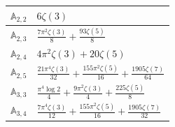 \documentclass{amsart}
\theoremstyle{definition}
\begin{document}
\begin{center}
\begin{tabular}{ |l|l| }
    $\mathbb{A}_{2,2}$ & $6\zeta(3)$   \\ \hline
    $\mathbb{A}_{2,3}$ & $\frac{7\pi ^2 \zeta (3)}{8}+\frac{93 \zeta (5)}{8}$    \\ \hline
    $\mathbb{A}_{2,4}$ & $4\pi^2\zeta(3)+20\zeta(5)$   \\ \hline
    $\mathbb{A}_{2,5}$ & $\frac{21 \pi ^4 \zeta (3)}{32}+\frac{155 \pi ^2 \zeta (5)}{16}+\frac{1905 \zeta (7)}{64}$   \\ \hline
    $\mathbb{A}_{3,3}$ & $
    \frac{\pi^4\log 2}{4}+\frac{9\pi^2\zeta(3)}{4}+\frac{225\zeta(5)}{8}$  \\ \hline
    $\mathbb{A}_{3,4}$ & $\frac{7 \pi ^4 \zeta (3)}{12}+\frac{155 \pi ^2 \zeta (5)}{16}+\frac{1905 \zeta (7)}{32}$   \\ \hline
\end{tabular}
\end{center}
\end{document}
